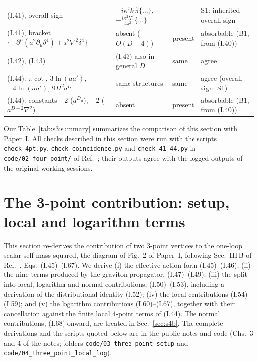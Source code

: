 \documentclass[aps,prd,onecolumn,10pt,nofootinbib,floatfix]{revtex4-2}
\newcommand{\PI}{Paper~I}
\newcommand{\eqI}[1]{(I.#1)}
\newcommand{\pihat}{\hat\pi}
\begin{document}
\begin{table}[t]
\begin{ruledtabular}
\begin{tabular}{>{\raggedright\arraybackslash}p{}>{\raggedright\arraybackslash}p{}>{\raggedright\arraybackslash}p{}>{\raggedright\arraybackslash}p{}}
\eqI{41}, overall sign & $-i\kappa^2k\,\pihat\{\dots\}$, \ $-\frac{i\kappa^2H^2}{4\pi^2}\{\dots\}$ & $+$ & S1: inherited overall sign\\
\eqI{41}, bracket $\{-\partial^\mu(a^2\partial_\mu\delta^4)+a^2\nabla^2\delta^4\}$ & absent ($O(D-4)$) & present
 & absorbable (B1, from \eqI{40})\\
\eqI{42}, \eqI{43} & \eqI{43} also in general $D$ & same & agree\\
\eqI{44}: $\pi\cot$, $3\ln(aa')$, $-4\ln(aa')$, $9H^2a^D$ & same structures & same & agree (overall sign: S1)\\
\eqI{44}: constants $-2$ ($a^D\square$), $+2$ ($a^{D-2}\nabla^2$) & absent & present & absorbable (B1, from \eqI{40})\\
\end{tabular}
\end{ruledtabular}
\end{table}

Our Table~\ref{tab:s3:summary} summarizes the comparison of this section with \PI.
All checks described in this section were run with the scripts \mbox{\nolinkurl{check_4pt.py}},
\mbox{\nolinkurl{check_coincidence.py}} and \mbox{\nolinkurl{check_41_44.py}} in
\nolinkurl{code/02_four_point/} of Ref.~\cite{ref:repo}; their outputs agree with the logged
outputs of the original working sessions.

\providecommand{\sIVaBr}[3]{\big[\!\big[\,#1\,\big|\,#2\,\big]\!\big]_{#3}}
\providecommand{\sIVacode}[1]{\texttt{code/#1}}

\section{The 3-point contribution: setup, local and logarithm terms}
\label{sec:s4a}

This section re-derives the contribution of two 3-point vertices to the one-loop scalar
self-mass-squared, the diagram of Fig.~2 of \PI, following Sec.~III\,B of Ref.~\cite{KW07},
Eqs.~\eqI{45}--\eqI{67}. We derive
(i) the effective-action form \eqI{45}--\eqI{46};
(ii) the nine terms produced by the graviton propagator, \eqI{47}--\eqI{49};
(iii) the split into local, logarithm and normal contributions, \eqI{50}--\eqI{53}, including a
derivation of the distributional identity \eqI{52};
(iv) the local contributions \eqI{54}--\eqI{59}; and
(v) the logarithm contributions \eqI{60}--\eqI{67}, together with their cancellation against the
finite local 4-point terms of \eqI{44}.
The normal contributions, \eqI{68} onward, are treated in Sec.~\ref{sec:s4b}.
The complete derivations and the scripts quoted below are in the public notes and code
\cite{ref:repo} (Chs.~3 and 4 of the notes; folders \sIVacode{03\_three\_point\_setup} and
\sIVacode{04\_three\_point\_local\_log}).
\end{document}
